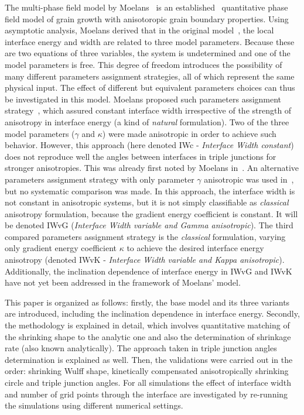 The multi-phase field model by Moelans~\cite{Moelans2008} is an established~\cite{Miyoshi2020} quantitative phase field model of grain growth with anisotoropic grain boundary properties. Using asymptotic analysis, Moelans derived that in the original model~\cite{Moelans2008}, the local interface energy and width are related to three model parameters. Because these are two equations of three variables, the system is undetermined and one of the model parameters is free. This degree of freedom introduces the possibility of many different parameters assignment strategies, all of which represent the same physical input. The effect of different but equivalent parameters choices can thus be investigated in this model. Moelans proposed such parameters assignment strategy~\cite{Moelans2008}, which assured constant interface width irrespective of the strength of anisotropy in interface energy (a kind of \textit{natural} formulation). Two of the three model parameters ($\gamma$ and $\kappa$) were made anisotropic in order to achieve such behavior. However, this approach (here denoted IWc - \textit{Interface Width constant}) does not reproduce well the angles between interfaces in triple junctions for stronger anisotropies. This was already first noted by Moelans in~\cite{Moelans2010}. An alternative parameters assignment strategy with only parameter $\gamma$ anisotropic was used in~\cite{Ravash2017,Miyoshi2020}, but no systematic comparison was made. In this approach, the interface width is not constant in anisotropic systems, but it is not simply classifiable as \textit{classical} anisotropy formulation, because the gradient energy coefficient is constant. It will be denoted IWvG (\textit{Interface Width variable and Gamma anisotropic}). The third compared parameters assignment strategy is the \textit{classical} formulation, varying only gradient energy coefficient $\kappa$ to achieve the desired interface energy anisotropy (denoted IWvK - \textit{Interface Width variable and Kappa anisotropic}). Additionally, the inclination dependence of interface energy in IWvG and IWvK have not yet been addressed in the framework of Moelans' model. 

This paper is organized as follows: firstly, the base model and its three variants are introduced, including the inclination dependence in interface energy. Secondly, the methodology is explained in detail, which involves quantitative matching of the shrinking shape to the analytic one and also the determination of shrinkage rate (also known analytically). The approach taken in triple junction angles determination is explained as well. Then, the validations were carried out in the order: shrinking Wulff shape, kinetically compensated anisotropically shrinking circle and triple junction angles. For all simulations the effect of interface width and number of grid points through the interface are investigated by re-running the simulations using different numerical settings.


